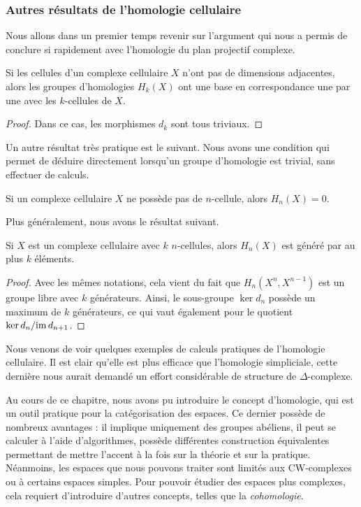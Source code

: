 \subsubsection{Autres résultats de l'homologie cellulaire}

Nous allons dans un premier temps revenir sur l'argument qui nous a permis de conclure si rapidement avec l'homologie du plan projectif complexe.

\begin{proposition}
Si les cellules d'un complexe cellulaire $X$ n'ont pas de dimensions adjacentes, alors les groupes d'homologies $H_k(X)$ ont une base en correspondance une par une avec les $k$-cellules de $X$.
\end{proposition}
\begin{proof}
Dans ce cas, les morphismes $d_k$ sont tous triviaux.
\end{proof}

Un autre résultat très pratique est le suivant. Nous avons une condition qui permet de déduire directement lorsqu'un groupe d'homologie est trivial, sans effectuer de calculs.

\begin{proposition}
Si un complexe cellulaire $X$ ne possède pas de $n$-cellule, alors $H_n(X)=0$.
\end{proposition}
Plus généralement, nous avons le résultat suivant.
\begin{proposition}
Si $X$ est un complexe cellulaire avec $k$ $n$-cellules, alors $H_n(X)$ est généré par au plus $k$ éléments.
\end{proposition}
\begin{proof}
Avec les mêmes notations, cela vient du fait que $H_n(X^n,X^{n-1})$ est un groupe libre avec $k$ générateurs. Ainsi, le sous-groupe $\ker d_n$ possède un maximum de $k$ générateurs, ce qui vaut également pour le quotient $\ker d_n/\mathrm{im}\, d_{n+1}$.
\end{proof}

Nous venons de voir quelques exemples de calculs pratiques de l'homologie cellulaire. Il est clair qu'elle est plus efficace que l'homologie simpliciale, cette dernière nous aurait demandé un effort considérable de structure de $\Delta$-complexe.

\bigskip Au cours de ce chapitre, nous avons pu introduire le concept d'homologie, qui est un outil pratique pour la catégorisation des espaces. Ce dernier possède de nombreux avantages : il implique uniquement des groupes abéliens, il peut se calculer à l'aide d'algorithmes, possède différentes construction équivalentes permettant de mettre l'accent à la fois sur la théorie et sur la pratique. Néanmoins, les espaces que nous pouvons traiter sont limités aux CW-complexes ou à certains espaces simples. Pour pouvoir étudier des espaces plus complexes, cela requiert d'introduire d'autres concepts, telles que la \emph{cohomologie}.